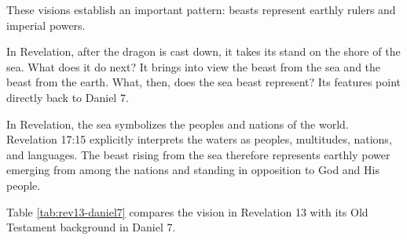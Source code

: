 These visions establish an important pattern: beasts represent earthly rulers and imperial powers.

In Revelation, after the dragon is cast down, it takes its stand on the shore of the sea. What does it do next? It brings into view the beast from the sea and the beast from the earth. What, then, does the sea beast represent? Its features point directly back to Daniel 7.

In Revelation, the sea symbolizes the peoples and nations of the world. Revelation 17:15 explicitly interprets the waters as peoples, multitudes, nations, and languages. The beast rising from the sea therefore represents earthly power emerging from among the nations and standing in opposition to God and His people.

Table \ref{tab:rev13-daniel7} compares the vision in Revelation 13 with its Old Testament background in Daniel 7.

